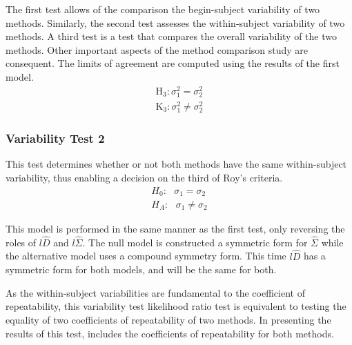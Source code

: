 \documentclass[12pt, a4paper]{report}
\theoremstyle{plain}
\theoremstyle{definition}
\theoremstyle{remark}
\begin{document}
	
	
	The first test allows of the comparison the begin-subject variability of two methods. Similarly, the second test assesses the within-subject variability of two methods. A third test is a test that compares the overall variability of the two methods. Other important aspects of the method comparison study are consequent. The limits of agreement are computed using the results of the first model.
	\begin{eqnarray*}
		\operatorname{H_3} : \sigma^2_1 = \sigma^2_2 \\
		\operatorname{K_3} : \sigma^2_1 \neq \sigma^2_2
	\end{eqnarray*}
	
	\subsubsection{Variability Test 2}
	
	This test determines whether or not both methods have the same within-subject variability, thus enabling a decision on the third of Roy's criteria.
	\begin{eqnarray*}
		H_{0}: \mbox{ }\sigma_{1}  = \sigma_{2} \\
		H_{A}: \mbox{ }\sigma_{1}  \neq \sigma_{2}
	\end{eqnarray*}
	
	This model is performed in the same manner as the first test, only reversing the roles of $l{\hat{D}}$ and $l{\hat{\Sigma}}$. The null model is constructed a symmetric form for ${\hat{\Sigma}}$ while the alternative model uses a compound symmetry form. This time $l{\hat{D}}$ has a symmetric form for both models, and will be the same for both.
	
	As the within-subject variabilities are fundamental to the coefficient of repeatability, this variability test likelihood ratio test is equivalent to testing the equality of two coefficients of repeatability of two methods. In presenting the results of this test, \citet{ARoy2009} includes the coefficients of repeatability for both methods.
	
\end{document}
